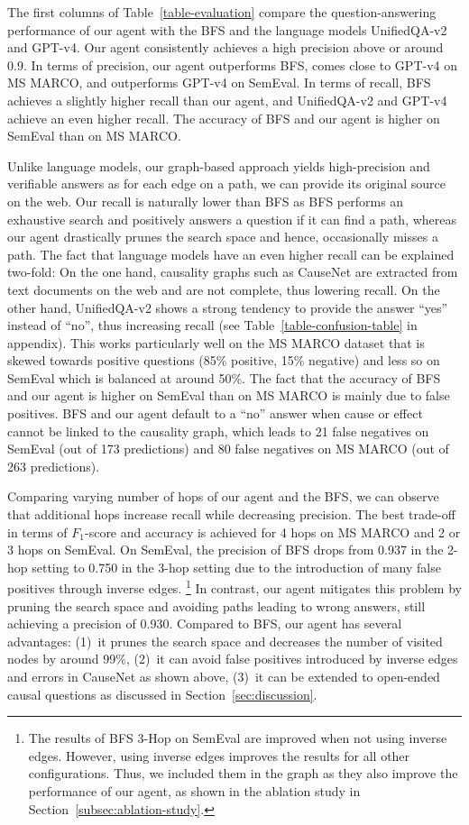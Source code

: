 The first columns of Table~\ref{table-evaluation} compare the question-answering performance of our agent with the BFS and the language models UnifiedQA-v2 and GPT-v4. Our agent consistently achieves a high precision above or around 0.9. In terms of precision, our agent outperforms BFS, comes close to GPT-v4 on MS MARCO, and outperforms GPT-v4 on SemEval. In terms of recall, BFS achieves a slightly higher recall than our agent, and UnifiedQA-v2 and GPT-v4 achieve an even higher recall. The accuracy of BFS and our agent is higher on SemEval than on MS MARCO.

Unlike language models, our graph-based approach yields high-precision and verifiable answers as for each edge on a path, we can provide its original source on the web. Our recall is naturally lower than BFS as BFS performs an exhaustive search and positively answers a question if it can find a path, whereas our agent drastically prunes the search space and hence, occasionally misses a path. The fact that language models have an even higher recall can be explained two-fold: On the one hand, causality graphs such as CauseNet are extracted from text documents on the web and are not complete, thus lowering recall. On the other hand, UnifiedQA-v2 shows a strong tendency to provide the answer ``yes'' instead of ``no'', thus increasing recall (see Table~\ref{table-confusion-table} in appendix). This works particularly well on the MS MARCO dataset that is skewed towards positive questions (85\% positive, 15\% negative) and less so on SemEval which is balanced at around 50\%. The fact that the accuracy of BFS and our agent is higher on SemEval than on MS MARCO is mainly due to false positives. BFS and our agent default to a ``no'' answer when cause or effect cannot be linked to the causality graph, which leads to 21 false negatives on SemEval (out of 173 predictions) and 80 false negatives on MS MARCO (out of 263 predictions).

Comparing varying number of hops of our agent and the BFS, we can observe that additional hops increase recall while decreasing precision. The best trade-off in terms of $F_1$-score and accuracy is achieved for 4 hops on MS MARCO and 2 or 3 hops on SemEval. On SemEval, the precision of BFS drops from 0.937 in the 2-hop setting to 0.750 in the 3-hop setting due to the introduction of many false positives through inverse edges.%
\footnote{The results of BFS 3-Hop on SemEval are improved when not using inverse edges. However, using inverse edges improves the results for all other configurations. Thus, we included them in the graph as they also improve the performance of our agent, as shown in the ablation study in Section~\ref{subsec:ablation-study}.} In contrast, our agent mitigates this problem by pruning the search space and avoiding paths leading to wrong answers, still achieving a precision of 0.930. Compared to BFS, our agent has several advantages:
(1)~it prunes the search space and decreases the number of visited nodes by around 99\%,
(2)~it can avoid false positives introduced by inverse edges and errors in CauseNet as shown above,
(3)~it can be extended to open-ended causal questions as discussed in Section~\ref{sec:discussion}.

